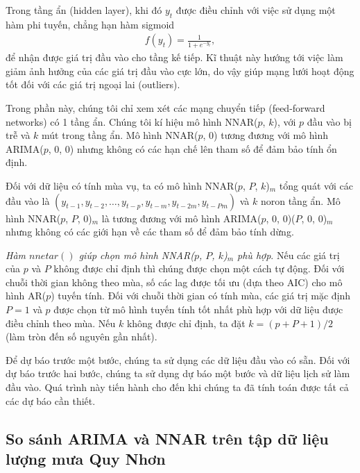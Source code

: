 \documentclass[12pt, a4paper,oneside]{book}
\theoremstyle{definition}
\begin{document}
Trong tầng ẩn (hidden layer), khi đó $y_t$ được điều chỉnh với việc sử dụng một hàm phi tuyến, chẳng hạn hàm sigmoid
\begin{align*}
f(y_t) = \frac{1}{1+e^{-y_t}},
\end{align*}
để nhận được giá trị đầu vào cho tầng kế tiếp. Kĩ thuật này hướng tới việc làm giảm ảnh hưởng của các giá trị đầu vào cực lớn, do vậy giúp mạng lưới hoạt động tốt đối với các giá trị ngoại lai (outliers). 

Trong phần này, chúng tôi chỉ xem xét các mạng chuyển tiếp (feed-forward networks) có 1 tầng ẩn. Chúng tôi kí hiệu mô hình NNAR($p$, $k$), với $p$ đầu vào bị trễ và $k$ mút trong tầng ẩn.  Mô hình NNAR($p$, 0) tương đương với mô hình ARIMA($p$, 0, 0) nhưng không có các hạn chế lên tham số để đảm bảo tính ổn định.

Đối với dữ liệu có tính mùa vụ, ta có mô hình NNAR($p$, $P$, $k$)$_m$ tổng quát với các đầu vào là $(y_{t-1}, y_{t-2},\dots, y_{t-p}, y_{t-m}, y_{t-2m}, y_{t-Pm})$ và $k$ noron tầng ẩn. Mô hình NNAR($p$, $P$, 0)$_m$ là tương đương với mô hình ARIMA($p$, 0, 0)($P$, 0, 0)$_m$ nhưng không có các giới hạn về các tham số để đảm bảo tính dừng.

\textit{Hàm $nnetar()$ giúp chọn mô hình NNAR($p$, $P$, $k$)$_m$ phù hợp}. Nếu các giá trị của $p$ và $P$ không được chỉ định thì chúng được chọn một cách tự động. Đối với chuỗi thời gian không theo mùa, số các lag được tối ưu (dựa theo AIC) cho mô hình AR($p$) tuyến tính. Đối với chuỗi thời gian có tính mùa, các giá trị mặc định $P=1$ và $p$ được chọn từ mô hình tuyến tính tốt nhất phù hợp với dữ liệu được điều chỉnh theo mùa. Nếu $k$ không được chỉ định, ta đặt $k = (p + P + 1)/2$ (làm tròn đến số nguyên gần nhất).

Để dự báo trước một bước, chúng ta sử dụng các dữ liệu đầu vào có sẵn. Đối với dự báo trước hai bước, chúng ta sử dụng dự báo một bước và dữ liệu lịch sử làm đầu vào. Quá trình này tiến hành cho đến khi chúng ta đã tính toán được tất cả các dự báo cần thiết.

\subsection*{So sánh ARIMA và NNAR trên tập dữ liệu lượng mưa Quy Nhơn}
\end{document}
